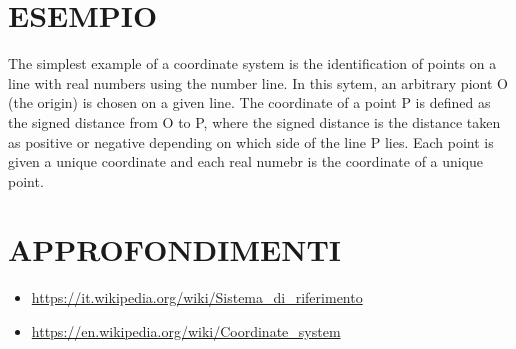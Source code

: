 \documentclass[a4paper,10pt]{article}
\begin{document}
\section{ESEMPIO}
The simplest example of a coordinate system is the identification of points on a line with real numbers using the number line.
In this sytem, an arbitrary piont O (the origin) is chosen on a given line. The coordinate of a point P is defined as the signed
distance from O to P, where the signed distance is the distance taken as positive or negative depending on which side of the
line P lies. Each point is given a unique coordinate and each real numebr is the coordinate of a unique point.

\section{APPROFONDIMENTI}

\begin{itemize}
 \item \url{https://it.wikipedia.org/wiki/Sistema_di_riferimento}
 \item \url{https://en.wikipedia.org/wiki/Coordinate_system}
\end{itemize}
\end{document}

